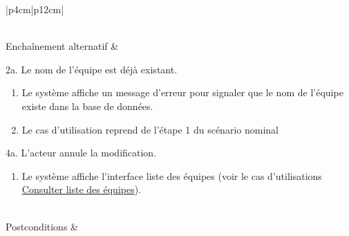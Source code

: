 \begin{longtable}{|p{4cm}|p{12cm}|}
\begin{minipage}[t]{\linewidth}
\begin{enumerate}[itemindent=0pt, leftmargin=*, nosep,after=\vspace{-\baselineskip},before=\vspace{-0.5\baselineskip}]
                    \end{enumerate}
                    \end{minipage}
                     \\
                    \hline
                    Enchaînement alternatif &  
                    \begin{minipage}[t]{\linewidth}
                        2a. Le nom de l'équipe est déjà existant.
                        \begin{enumerate}[nosep,after=\strut]
                              \item Le système affiche un message d'erreur pour signaler que le nom de l'équipe existe dans la base de données.
                              \item Le cas d’utilisation reprend de l’étape 1 du scénario nominal
                        \end{enumerate}
                        4a. L'acteur annule la modification.
                        \begin{enumerate}[nosep,after=\strut]
                              \item Le système affiche l'interface liste des équipes (voir le cas d’utilisations \underline{Consulter liste des équipes}).
                        \end{enumerate}
                    \end{minipage}
                    \\
                    
                    \hline
                    Postconditions &   \\
                    \hline
                    \caption{Description du cas d'utilisation « Modifier un planning »}\\
            \end{longtable}

